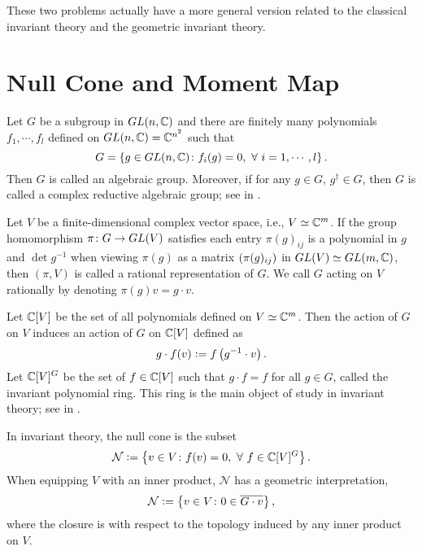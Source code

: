 \documentclass[suri,pdfbookmark]{engsuribt} %
\begin{document}
  These two problems actually have a more general version related to the classical invariant theory and the geometric invariant theory.

  \section{Null Cone and Moment Map}

  Let $G$ be a subgroup in $GL(n,\mathbb{C})$ and there are finitely many polynomials $f_1,\cdots,f_l$ defined on $GL(n,\mathbb{C}) = \mathbb{C}^{n^2}$ such that
  \begin{equation*}
    G = \left\{g \in GL(n,\mathbb{C}) \colon f_i(g) = 0,~\forall~i=1,\cdots,l\right\}.
  \end{equation*}
  Then $G$ is called an algebraic group. Moreover, if for any $g \in G$, $g^{\dagger} \in G$, then $G$ is called a complex reductive algebraic group; see in \cite{key5}. 

  Let $V$ be a finite-dimensional complex vector space, i.e., $V \simeq \mathbb{C}^m$. If the group homomorphism $\pi \colon G \rightarrow GL(V)$ satisfies each entry $\pi(g)_{ij}$ is a polynomial in $g$ and $\det g^{-1}$ when viewing $\pi(g)$ as a matrix $\left(\pi(g)_{ij}\right)$ in $GL(V) \simeq GL(m,\mathbb{C})$, then $(\pi,V)$ is called a rational representation of $G$. We call $G$ acting on $V$ rationally by denoting $\pi(g) v = g \cdot v$.

  Let $\mathbb{C}[V]$ be the set of all polynomials defined on $V \simeq \mathbb{C}^m$. Then the action of $G$ on $V$ induces an action of $G$ on $\mathbb{C}[V]$ defined as
  \begin{equation*}
    g \cdot f(v) \vcentcolon= f\left(g^{-1}\cdot v\right).
  \end{equation*}
  Let $\mathbb{C}[V]^G$ be the set of $f \in \mathbb{C}[V]$ such that $g \cdot f = f$ for all $g \in G$, called the invariant polynomial ring. This ring is the main object of study in invariant theory; see in \cite{key19}.

  In invariant theory, the null cone is the subset
  \begin{equation*}
    \mathcal{N} \vcentcolon= \left\{v \in V \colon f(v) = 0,~\forall~f \in \mathbb{C}[V]^G\right\}.
  \end{equation*}
  When equipping $V$ with an inner product, $\mathcal{N}$ has a geometric interpretation,
  \begin{equation*}
    \mathcal{N} \vcentcolon= \left\{v \in V \colon 0 \in \overline{G \cdot v}\right\},
  \end{equation*}
  where the closure is with respect to the topology induced by any inner product on $V$. 
\end{document}
